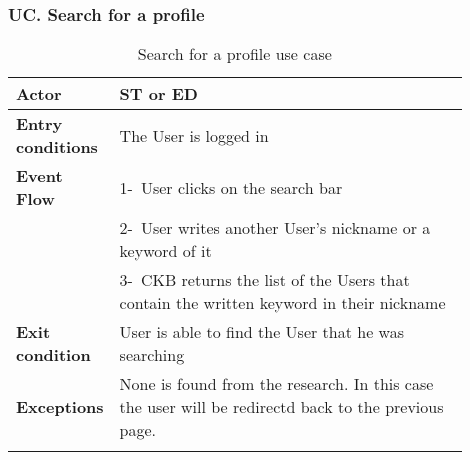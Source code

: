 \subsubsection*{UC\cuc . Search for a profile}
\begin{center}
    \begin{longtable}{|l|p{0.9\linewidth}|}
        \hline
        \textbf{Actor}            & ST or ED                                                                                                                                                                                       \\
        \hline
        \textbf{Entry conditions} & The User is logged in  \\
        \hline
        \textbf{Event Flow}       & 1-\ User clicks on the search bar        \\
        & 2-\ User writes another User's nickname or a keyword of it \\
        & 3-\ CKB returns the list of the Users that contain the written keyword in their nickname         \\
        \hline
        \textbf{Exit condition}   & User is able to find the User that he was searching        \\
        \hline
        \textbf{Exceptions}        &  None is found from the research. In this case the user will be redirectd back to the previous page.\\
        \hline
        \caption{Search for a profile use case}
        \label{tab: search_for_a_profile_use_case}
    \end{longtable}
\end{center}

